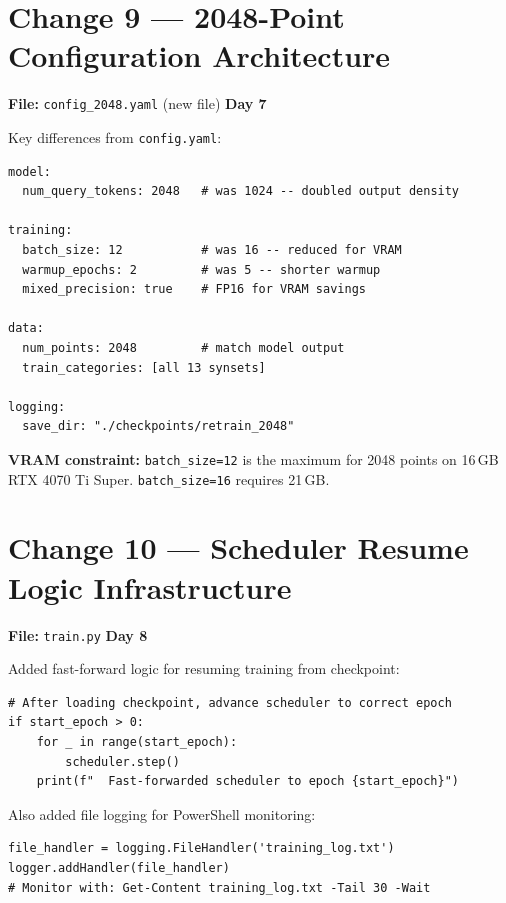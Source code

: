 \documentclass[10pt,a4paper]{article}
\begin{document}
\section*{Change 9 --- 2048-Point Configuration \hfill \normalfont\small Architecture}

\textbf{File:} \texttt{config\_2048.yaml} (new file) \hfill \textbf{Day 7}

Key differences from \texttt{config.yaml}:

\begin{lstlisting}[style=yaml]
model:
  num_query_tokens: 2048   # was 1024 -- doubled output density

training:
  batch_size: 12           # was 16 -- reduced for VRAM
  warmup_epochs: 2         # was 5 -- shorter warmup
  mixed_precision: true    # FP16 for VRAM savings

data:
  num_points: 2048         # match model output
  train_categories: [all 13 synsets]

logging:
  save_dir: "./checkpoints/retrain_2048"
\end{lstlisting}

\textbf{VRAM constraint:} \texttt{batch\_size=12} is the maximum for 2048 points on 16\,GB RTX 4070 Ti Super. \texttt{batch\_size=16} requires 21\,GB.

\section*{Change 10 --- Scheduler Resume Logic \hfill \normalfont\small Infrastructure}

\textbf{File:} \texttt{train.py} \hfill \textbf{Day 8}

Added fast-forward logic for resuming training from checkpoint:
\begin{lstlisting}
# After loading checkpoint, advance scheduler to correct epoch
if start_epoch > 0:
    for _ in range(start_epoch):
        scheduler.step()
    print(f"  Fast-forwarded scheduler to epoch {start_epoch}")
\end{lstlisting}

Also added file logging for PowerShell monitoring:
\begin{lstlisting}
file_handler = logging.FileHandler('training_log.txt')
logger.addHandler(file_handler)
# Monitor with: Get-Content training_log.txt -Tail 30 -Wait
\end{lstlisting}
\end{document}
